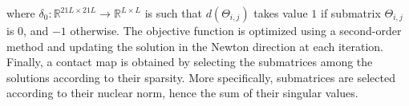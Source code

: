         where $\delta_0: \mathbb{R}^{21L \times 21L} \rightarrow \mathbb{R}^{L \times L}$ is such that
        $d(\Theta_{i, j})$ takes value $1$ if submatrix $\Theta_{i, j}$ is $0$, and $-1$ otherwise.  %
        The objective function is optimized using a second-order method and updating the solution in the Newton direction at each iteration.
        Finally, a contact map is obtained by selecting the submatrices among the solutions according to their sparsity.
        More specifically, submatrices are selected according to their nuclear norm, hence the sum of their singular values.  %
